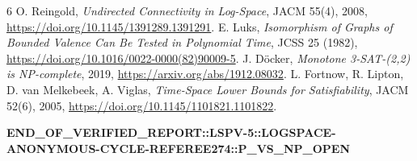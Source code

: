 \documentclass[11pt]{article}
\begin{document}
\begin{thebibliography}{6}
 O. Reingold, \emph{Undirected Connectivity in Log-Space}, JACM 55(4), 2008, \url{https://doi.org/10.1145/1391289.1391291}.
 E. Luks, \emph{Isomorphism of Graphs of Bounded Valence Can Be Tested in Polynomial Time}, JCSS 25 (1982), \url{https://doi.org/10.1016/0022-0000(82)90009-5}.
 J. D\"ocker, \emph{Monotone 3-SAT-(2,2) is NP-complete}, 2019, \url{https://arxiv.org/abs/1912.08032}.
 L. Fortnow, R. Lipton, D. van Melkebeek, A. Viglas, \emph{Time-Space Lower Bounds for Satisfiability}, JACM 52(6), 2005, \url{https://doi.org/10.1145/1101821.1101822}.
\end{thebibliography}

\noindent\small\textbf{END\_OF\_VERIFIED\_REPORT::LSPV-5::LOGSPACE-ANONYMOUS-CYCLE-REFEREE274::P\_VS\_NP\_OPEN}
\end{document}
